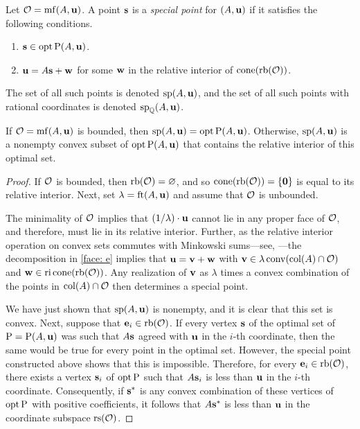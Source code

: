 \documentclass[11pt]{amsart}
\begin{document}
\begin{definition}
\label{mc: D} 
Let $\mathcal{O} = \operatorname{mf}(A, \mathbf{u})$.  A point $\mathbf{s}$ is a \emph{special point} for $(A, \mathbf{u})$ if it satisfies the following conditions.
\begin{enumerate}
\item $\mathbf{s} \in \operatorname{opt} \mathrm{P}(A, \mathbf{u})$.
\item $\mathbf{u} = A \mathbf{s} + \mathbf{w}$ for some $\mathbf{w}$ in the relative interior of $\operatorname{cone} ( \operatorname{rb}(\mathcal{O}))$.  
\end{enumerate}

The set of all such points is denoted $\operatorname{sp}(A, \mathbf{u})$, and the set of all such points with rational coordinates is denoted $\operatorname{sp}_{\mathbb{Q}}(A, \mathbf{u})$.  
\end{definition}


\begin{proposition}  
\label{opt versus mc: P}  If $\mathcal{O} = \operatorname{mf}(A, \mathbf{u})$ is bounded, then $\operatorname{sp}(A, \mathbf{u}) = \operatorname{opt} \mathrm{P}(A, \mathbf{u})$.  Otherwise,  $\operatorname{sp}(A, \mathbf{u})$ is a nonempty convex subset of $\operatorname{opt} \mathrm{P}(A, \mathbf{u})$ that contains the relative interior of this optimal set. 
\end{proposition}

\begin{proof}    
If $\mathcal{O}$ is bounded, then $\operatorname{rb}(\mathcal{O}) = \varnothing$, and so $\operatorname{cone}( \operatorname{rb}(\mathcal{O})) = \{\mathbf{0} \}$ is equal to its relative interior.  Next, set $\lambda = \operatorname{ft}(A, \mathbf{u})$ and assume that $\mathcal{O}$ is unbounded.

 The minimality of $\mathcal{O}$ implies that $(1/\lambda)  \cdot \mathbf{u}$ cannot lie in any proper face of $\mathcal{O}$, and therefore, must lie in its relative interior.  Further, as the relative interior operation on convex sets commutes with Minkowski sums---see, \eg \cite[Theorem 4.10(b)]{vantiel.convex_analysis}---the decomposition in \eqref{face: e}  implies that $\mathbf{u} = \mathbf{v} + \mathbf{w}$ with $\mathbf{v} \in \lambda \operatorname{conv}(\operatorname{col}(A) \cap \mathcal{O})$ and $\mathbf{w} \in \operatorname{ri} \operatorname{cone}(\operatorname{rb}(\mathcal{O}))$.  Any realization of $\mathbf{v}$ as $\lambda$ times a convex combination of the points in $\operatorname{col}(A) \cap \mathcal{O}$ then determines a special point.

We have just shown that $\operatorname{sp}(A, \mathbf{u})$ is nonempty, and it is clear that this set is convex.  Next,  suppose that $\mathbf{e}_i \in \operatorname{rb}(\mathcal{O})$.  If every vertex $\mathbf{s}$ of the optimal set of $\mathrm{P} = \mathrm{P}(A, \mathbf{u})$ was such that $A \mathbf{s}$ agreed with $\mathbf{u}$ in the $i$-th coordinate, then the same would be true for every point in the optimal set.   However, the special point constructed above shows that this is impossible.  Therefore, for every $\mathbf{e}_i \in \operatorname{rb}(\mathcal{O})$, there exists a vertex $\mathbf{s}_i$ of $\operatorname{opt} \mathrm{P}$ such that $A \mathbf{s}_i$ is less than $\mathbf{u}$ in the $i$-th coordinate.  Consequently, if $\mathbf{s}^{\ast}$ is any convex combination of these vertices of $\operatorname{opt} \mathrm{P}$ with positive coefficients, it follows that $A \mathbf{s}^{\ast}$ is less than $\mathbf{u}$ in the coordinate subspace $\operatorname{rs}(\mathcal{O})$.  
\end{proof}
\end{document}
